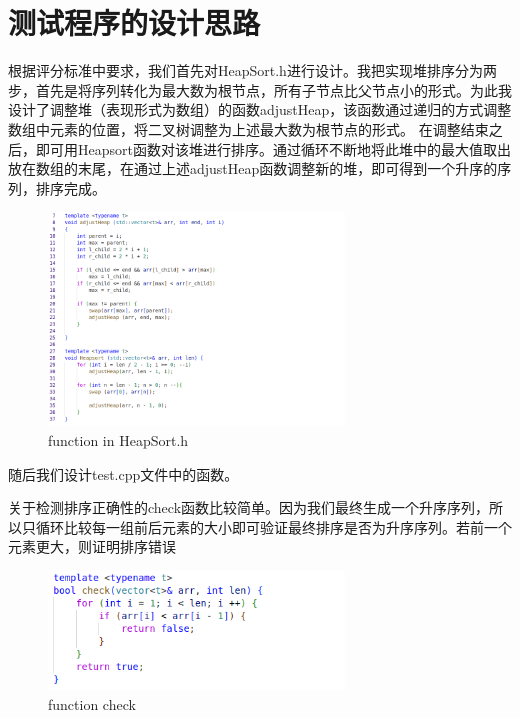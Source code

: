 \documentclass[UTF8]{ctexart}
\begin{document}
	
	\pagestyle{fancy}
	\fancyhead{}
	
	\section{测试程序的设计思路}
	
	根据评分标准中要求，我们首先对HeapSort.h进行设计。我把实现堆排序分为两步，首先是将序列转化为最大数为根节点，所有子节点比父节点小的形式。为此我设计了调整堆（表现形式为数组）的函数adjustHeap，该函数通过递归的方式调整数组中元素的位置，将二叉树调整为上述最大数为根节点的形式。
	在调整结束之后，即可用Heapsort函数对该堆进行排序。通过循环不断地将此堆中的最大值取出放在数组的末尾，在通过上述adjustHeap函数调整新的堆，即可得到一个升序的序列，排序完成。

	
	\begin{figure}[H] %
		\centering %
		\includegraphics[width=0.7\textwidth]{fig1} %
		\caption{function in HeapSort.h} %
	\end{figure}
	
	随后我们设计test.cpp文件中的函数。
	
	关于检测排序正确性的check函数比较简单。因为我们最终生成一个升序序列，所以只循环比较每一组前后元素的大小即可验证最终排序是否为升序序列。若前一个元素更大，则证明排序错误
	
	\begin{figure}[H] %
		\centering %
		\includegraphics[width=0.7\textwidth]{fig2} %
		\caption{function check} %
	\end{figure}
	
\end{document}
